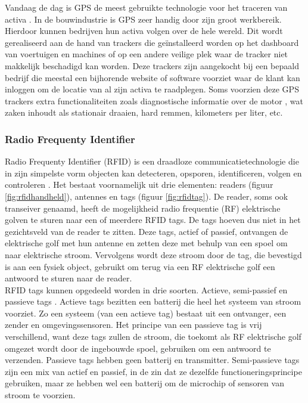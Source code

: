 Vandaag de dag is GPS de meest gebruikte technologie voor het traceren van activa \autocite{Nasr2013}. In de bouwindustrie is GPS zeer handig door zijn groot werkbereik. Hierdoor kunnen bedrijven hun activa volgen over de hele wereld. Dit wordt gerealiseerd aan de hand van trackers die geïnstalleerd worden op het dashboard van voertuigen en machines of op een andere veilige plek waar de tracker niet makkelijk beschadigd kan worden. Deze trackers zijn aangekocht bij een bepaald bedrijf die meestal een bijhorende website of software voorziet waar de klant kan inloggen om de locatie van al zijn activa te raadplegen. Soms voorzien deze GPS trackers extra functionaliteiten zoals diagnostische informatie over de motor \autocite{Devlin2009}, wat zaken inhoudt als stationair draaien, hard remmen, kilometers per liter, etc.

\subsubsection{Radio Frequenty Identifier}

Radio Frequenty Identifier (RFID) is een draadloze communicatietechnologie die in zijn simpelste vorm objecten kan detecteren, opsporen, identificeren, volgen en controleren \autocite{Tan2022}. Het bestaat voornamelijk uit drie elementen: readers (figuur \ref{fig:rfidhandheld}), antennes en tags (figuur \ref{fig:rfidtag}). De reader, soms ook transeiver genaamd, heeft de mogelijkheid radio frequentie (RF) elektrische golven te sturen naar een of meerdere RFID tags. De tags hoeven dus niet in het gezichtsveld van de reader te zitten. Deze tags, actief of passief, ontvangen de elektrische golf met hun antenne en zetten deze met behulp van een spoel om naar elektrische stroom. Vervolgens wordt deze stroom door de tag, die bevestigd is aan een fysiek object, gebruikt om terug via een RF elektrische golf een antwoord te sturen naar de reader.\\

RFID tags kunnen opgedeeld worden in drie soorten. Actieve, semi-passief en passieve tags \autocite{Mezzanotte2021}.  Actieve tags bezitten een batterij die heel het systeem van stroom voorziet. Zo een systeem (van een actieve tag) bestaat uit een ontvanger, een zender en omgevingssensoren. Het principe van een passieve tag is vrij verschillend, want deze tags zullen de stroom, die toekomt als RF elektrische golf omgezet wordt door de ingebouwde spoel, gebruiken om een antwoord te verzenden. Passieve tags hebben geen batterij en transmitter. Semi-passieve tags zijn een mix van actief en passief, in de zin dat ze dezelfde functioneringsprincipe gebruiken, maar ze hebben wel een batterij om de microchip of sensoren van stroom te voorzien.\\

